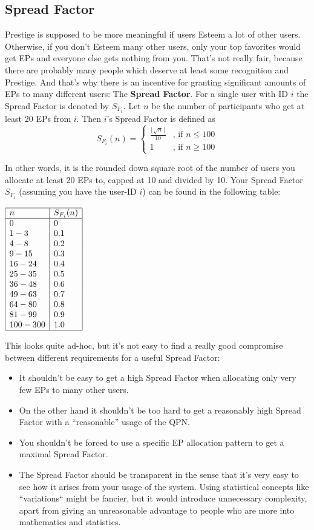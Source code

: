 \documentclass[a4paper,12pt]{scrartcl}
\begin{document}
\subsection{Spread Factor}
Prestige is supposed to be more meaningful if users Esteem a lot of other users. Otherwise, if you don't Esteem many other users, only your top favorites would get EPs and everyone else gets nothing from you. That's not really fair, because there are probably many people which deserve at least some recognition and Prestige. And that's why there is an incentive for granting significant amounts of EPs to many different users: The \textbf{Spread Factor}. For a single user with ID $i$ the Spread Factor is denoted by $S_{F_i}$. Let $n$ be the number of participants who get at least 20 EPs from $i$. Then $i$'s Spread Factor is defined as
$$S_{F_i}(n) = \left\{
\begin{array}{ll}
\frac{\lfloor \sqrt{n} \rfloor}{10} & \mbox{, if } n \leq 100 \\
1 & \mbox{, if } n \geq 100
\end{array}\right.
$$

In other words, it is the rounded down square root of the number of users you allocate at least 20 EPs to, capped at 10 and divided by 10. Your Spread Factor $S_{F_i}$ (assuming you have the user-ID $i$) can be found in the following table:

$\begin{array}{|l|l|}
\hline
n & S_{F_i}(n)\\
\hline
0 & 0\\
1-3 & 0.1\\
4-8 & 0.2\\
9-15 & 0.3\\
16-24 & 0.4\\
25-35 & 0.5\\
36-48 & 0.6\\
49-63 & 0.7\\
64-80 & 0.8\\
81-99 & 0.9\\
100-300 & 1.0\\
\hline
\end{array}$

This looks quite ad-hoc, but it's not easy to find a really good compromise between different requirements for a useful Spread Factor:
\begin{itemize}
 \item It shouldn't be easy to get a high Spread Factor when allocating only very few EPs to many other users.
 \item On the other hand it shouldn't be too hard to get a reasonably high Spread Factor with a ``reasonable'' usage of the QPN.
 \item You shouldn't be forced to use a specific EP allocation pattern to get a maximal Spread Factor.
 \item The Spread Factor should be transparent in the sense that it's very easy to see how it arises from your usage of the system. Using statistical concepts like ``variations`` might be fancier, but it would introduce unnecessary complexity, apart from giving an unreasonable advantage to people who are more into mathematics and statistics.
\end{itemize}
\end{document}
